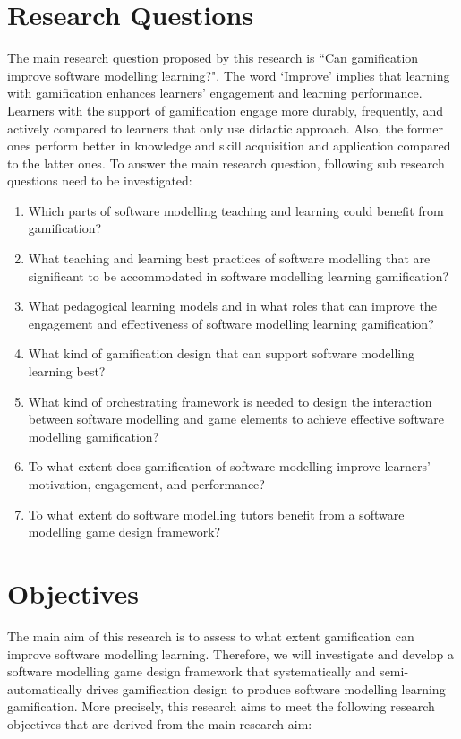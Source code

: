 \documentclass[12pt, a4paper]{report}
\begin{document}
{\section{Research Questions}
The main research question proposed by this research is ``Can gamification improve software modelling learning?". The word `Improve' implies that learning with gamification enhances learners' engagement and learning performance. Learners with the support of gamification engage more durably, frequently, and actively compared to learners that only use didactic approach. Also, the former ones perform better in knowledge and skill acquisition and application compared to the latter ones. To answer the main research question, following sub research questions need to be investigated:
\begin{enumerate}
\item Which parts of software modelling teaching and learning could benefit from gamification?
\item What teaching and learning best practices of software modelling that are significant to be accommodated in software modelling learning gamification?
\item What pedagogical learning models and in what roles that can improve the engagement and effectiveness of software modelling learning gamification?
\item What kind of gamification design that can support software modelling learning best? 
\item What kind of orchestrating framework is needed to design the interaction between software modelling and game elements to achieve effective software modelling gamification?
\item To what extent does gamification of software modelling improve learners' motivation, engagement, and performance?
\item To what extent do software modelling tutors benefit from a software modelling game design framework?
\end{enumerate}

\section{Objectives}
\label{Objectives}
The main aim of this research is to assess to what extent gamification can improve software modelling learning. Therefore, we will investigate and develop a software modelling game design framework that systematically and semi-automatically drives gamification design to produce software modelling learning gamification. More precisely, this research aims to meet the following research objectives that are derived from the main research aim:

}
\end{document}
